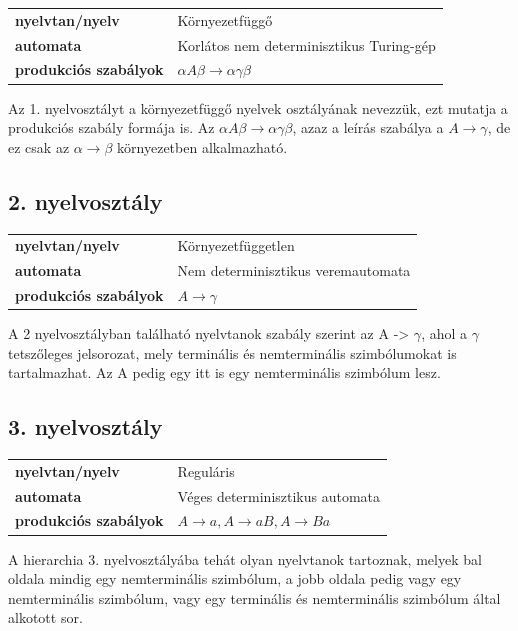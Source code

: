 \begin{tabular}{ll}
\textbf{nyelvtan/nyelv} & Környezetfüggő \\
\textbf{automata} & Korlátos nem determinisztikus Turing-gép \\
\textbf{produkciós szabályok} & $\alpha A \beta \rightarrow \alpha \gamma \beta$ \\
\end{tabular}

\medskip

Az 1. nyelvosztályt a környezetfüggő nyelvek osztályának nevezzük, ezt mutatja a produkciós szabály formája is.
Az $\alpha A \beta \rightarrow \alpha \gamma \beta$, azaz a leírás szabálya a $A \rightarrow \gamma$, de ez csak az $\alpha \rightarrow \beta$ környezetben alkalmazható.

\subsection*{2. nyelvosztály}

\begin{tabular}{ll}
\textbf{nyelvtan/nyelv} & Környezetfüggetlen \\
\textbf{automata} & Nem determinisztikus veremautomata \\
\textbf{produkciós szabályok} & $A \rightarrow \gamma$ \\
\end{tabular}

\medskip

A 2 nyelvosztályban található nyelvtanok szabály szerint az A -> $\gamma$, ahol a $\gamma$ tetszőleges jelsorozat, mely terminális és nemterminális szimbólumokat is tartalmazhat. Az A pedig egy itt is egy nemterminális szimbólum lesz.

\subsection*{3. nyelvosztály}

\begin{tabular}{ll}
\textbf{nyelvtan/nyelv} & Reguláris \\
\textbf{automata} & Véges determinisztikus automata \\
\textbf{produkciós szabályok} & $A \rightarrow a, A \rightarrow aB, A \rightarrow Ba$ \\
\end{tabular}

\medskip

A hierarchia 3. nyelvosztályába tehát olyan nyelvtanok tartoznak, melyek bal oldala mindig egy nemterminális szimbólum, a jobb oldala pedig vagy egy nemterminális szimbólum, vagy egy terminális és nemterminális szimbólum által alkotott sor.


